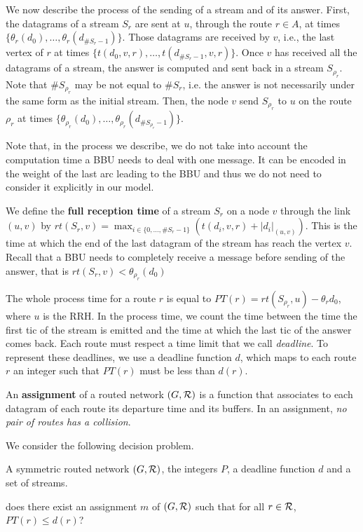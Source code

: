\documentclass[10pt]{article}
\newcommand\pall{\textsc{pall}\xspace}
\begin{document}
     
     We now describe the process of the sending of a stream and of its answer. First, the datagrams of a stream $S_r$ are sent at $u$, through the route $r \in A$, at times $\{\theta_r(d_0),\ldots,\theta_r(d_{\#S_r-1}) \}$.
      Those datagrams are received by $v$, i.e., the last vertex of $r$ at times $\{t(d_0,v,r),\ldots,t(d_{\#S_r-1},v,r)\}$. 
     Once $v$ has received all the datagrams of a stream, the answer is computed and sent back in a stream $S_{\rho_r}$. Note that $\#S_{\rho_r}$ may be not equal to $\#S_r$, i.e. the answer is not necessarily under the same form as the initial stream. Then, the node $v$ send $S_{\rho_r}$ to  $u$ on the route $\rho_r$ at times $\{\theta_{\rho_r}(d_0),\ldots,\theta_{\rho_r}(d_{\#S_{\rho_r}-1}) \}$.

     Note that, in the process we describe, we do not take into account the computation time a BBU needs to deal with one message. It can be encoded in the weight of the last arc leading to the BBU and thus we do not need to consider it explicitly in our model. 

      We define the {\bf full reception time} of a stream $S_r$ on a node $v$ through the link $(u,v)$ by $rt(S_r,v) =  \displaystyle \max_{i \in \{0,\ldots,\#S_r-1\}} ( t(d_i,v,r) + |d_i|_{(u,v)} )$. This is the time at which the end of the last datagram of the stream has reach the vertex $v$. Recall that a BBU needs to completely receive a message before sending of the answer, that is $rt(S_r,v)  < \theta_{\rho_r}(d_0)$
      

      The whole process time for a route $r$ is equal to $PT(r)= rt(S_{\rho_r},u) - \theta_r{d_0} $, where $u$ is the RRH.      
      In the process time, we count the time between the time the first tic of the stream is emitted and the time at which the last tic of the answer comes back. 
      Each route must respect a time limit that we call \emph{deadline}. To represent these deadlines, 
     we use a deadline function $d$, which maps to each route $r$ an integer such that $PT(r)$ must be less than $d(r)$.
  

        An {\bf assignment} of a routed network $(G,\cal R)$ is a function that associates to each datagram of each route its departure time and its buffers. In an assignment, \emph{no pair of routes has a collision}.
	 
      We consider the following decision problem.

      \noindent {\bf Periodic Assignment for Low Latency (\pall)} 

        A symmetric routed network $(G,{\cal R})$, the integers $P$, a deadline function $d$ and a set of streams.
      
       does there exist an assignment $m$ of $(G,{\cal R})$ such that for all $r \in {\cal R}$, $PT(r) \leq d(r)$?




\end{document}
